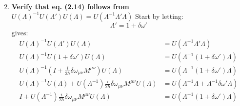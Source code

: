 \documentclass[9pt]{report}
\begin{document}
\begin{enumerate}
\[      \]
    \item \textbf{Verify that eq. (2.14) follows from $U(\Lambda)^{-1}U(\Lambda')U(\Lambda)=U(\Lambda^{-1}\Lambda'\Lambda)$}
      Start by letting:
      \[
        \Lambda' = 1 + \delta\omega'
      \]
      gives:
      \[
        \begin{align}
        U(\Lambda)^{-1}U(\Lambda')U(\Lambda)&=U(\Lambda^{-1}\Lambda'\Lambda)\\
        U(\Lambda)^{-1}U(1 + \delta\omega')U(\Lambda)&=U(\Lambda^{-1}(1 + \delta\omega')\Lambda)\\
        U(\Lambda)^{-1}(I + \frac{i}{2\hbar}\delta\omega_{\mu\nu}M^{\mu\nu})U(\Lambda)&=U(\Lambda^{-1}(1 + \delta\omega')\Lambda)\\
        U(\Lambda)^{-1}U(\Lambda) + U(\Lambda^{-1})\frac{i}{2\hbar}\delta\omega_{\mu\nu}M^{\mu\nu}U(\Lambda)&=U(\Lambda^{-1}\Lambda + \Lambda^{-1}\delta\omega'\Lambda)\\
        I + U(\Lambda^{-1})\frac{i}{2\hbar}\delta\omega_{\mu\nu}M^{\mu\nu}U(\Lambda)&=U(\Lambda^{-1}(1 + \delta\omega')\Lambda)\\
        \end{align}
      \]
  \end{enumerate}
\end{document}
